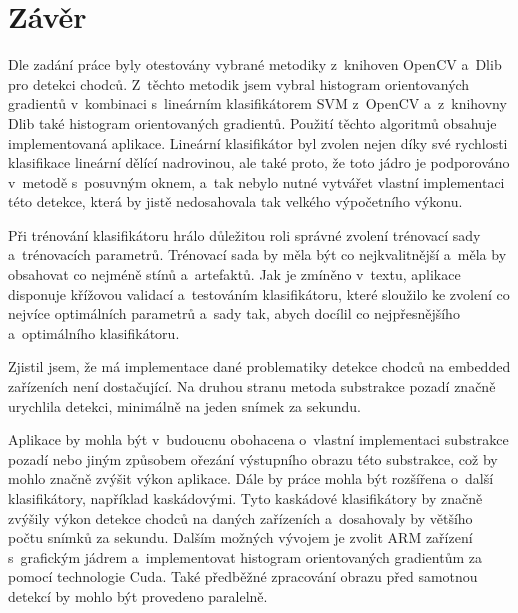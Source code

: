 \section{Závěr}
Dle zadání práce byly otestovány vybrané metodiky z~knihoven OpenCV a~Dlib pro detekci chodců. Z~těchto metodik jsem vybral histogram orientovaných gradientů v~kombinaci s~lineárním klasifikátorem SVM z~OpenCV a~z~knihovny Dlib také histogram orientovaných gradientů. Použití těchto algoritmů obsahuje implementovaná aplikace. Lineární klasifikátor byl zvolen nejen díky své rychlosti klasifikace lineární dělící nadrovinou, ale také proto, že toto jádro je podporováno v~metodě s~posuvným oknem, a~tak nebylo nutné vytvářet vlastní implementaci této detekce, která by jistě nedosahovala tak velkého výpočetního výkonu. 

Při trénování klasifikátoru hrálo důležitou roli správné zvolení trénovací sady a~trénovacích parametrů. Trénovací sada by měla být co nejkvalitnější a~měla by obsahovat co nejméně stínů a~artefaktů. Jak je zmíněno v~textu, aplikace disponuje křížovou validací a~testováním klasifikátoru, které sloužilo ke zvolení co nejvíce optimálních parametrů a~sady tak, abych docílil co nejpřesnějšího a~optimálního klasifikátoru.

Zjistil jsem, že má implementace dané problematiky detekce chodců na embedded zařízeních není dostačující. Na druhou stranu metoda substrakce pozadí značně urychlila detekci, minimálně na jeden snímek za sekundu.

Aplikace by mohla být v~budoucnu obohacena o~vlastní implementaci substrakce pozadí nebo jiným způsobem ořezání výstupního obrazu této substrakce, což by mohlo značně zvýšit výkon aplikace. Dále by práce mohla být rozšířena o~další klasifikátory, například kaskádovými. Tyto kaskádové klasifikátory by značně zvýšily výkon detekce chodců na daných zařízeních a~dosahovaly by většího počtu snímků za sekundu. Dalším možných vývojem je zvolit ARM zařízení s~grafickým jádrem a~implementovat histogram orientovaných gradientům za pomocí technologie Cuda. Také předběžné zpracování obrazu před samotnou detekcí by mohlo být provedeno paralelně.



